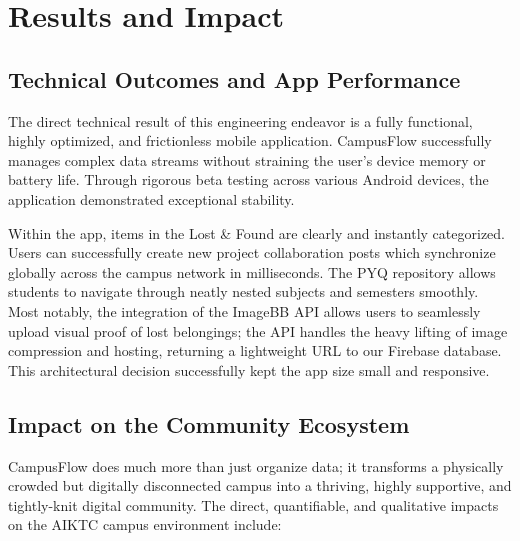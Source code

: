 \chapter{Results and Impact}

\section{Technical Outcomes and App Performance}
The direct technical result of this engineering endeavor is a fully functional, highly optimized, and frictionless mobile application. CampusFlow successfully manages complex data streams without straining the user's device memory or battery life. Through rigorous beta testing across various Android devices, the application demonstrated exceptional stability. 

Within the app, items in the Lost \& Found are clearly and instantly categorized. Users can successfully create new project collaboration posts which synchronize globally across the campus network in milliseconds. The PYQ repository allows students to navigate through neatly nested subjects and semesters smoothly. Most notably, the integration of the ImageBB API allows users to seamlessly upload visual proof of lost belongings; the API handles the heavy lifting of image compression and hosting, returning a lightweight URL to our Firebase database. This architectural decision successfully kept the app size small and responsive.

\section{Impact on the Community Ecosystem}
CampusFlow does much more than just organize data; it transforms a physically crowded but digitally disconnected campus into a thriving, highly supportive, and tightly-knit digital community. The direct, quantifiable, and qualitative impacts on the AIKTC campus environment include:

